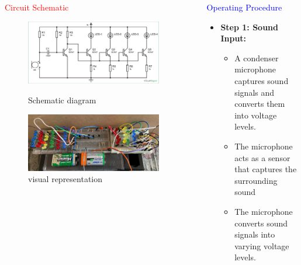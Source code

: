 \documentclass[final]{beamer}
\newlength{\sepwid}
\newlength{\onecolwid}
\newlength{\twocolwid}
\begin{document}
\begin{frame}[t]
\begin{columns}[t]
\begin{column}{\twocolwid}
\begin{block}{\textcolor{red}{Circuit Schematic}}
\begin{figure}
  \includegraphics[scale=1.1]{image1.png}
  \caption{Schematic diagram}
  \label{fig:image1}
 \vspace{3cm}
   \includegraphics[scale=1.1]{PIC1.png}
  \caption{visual representation}
  \label{fig:image1}
\end{figure}
\end{block}
\end{column}

\begin{column}{\sepwid}\end{column} %
\begin{column}{\onecolwid}
\begin{block}{\textcolor{blue}{Operating Procedure}}


\begin{itemize}
\item \textbf{ Step 1: Sound Input:}
\begin{itemize}
  \item A condenser microphone captures sound signals and converts them into voltage levels.
  \item The microphone acts as a sensor that captures the
surrounding sound
\item The microphone converts sound signals into varying voltage
levels.
\end{itemize}


\end{itemize}
\end{block}
\end{column}
\end{columns}
\end{frame}
\end{document}
